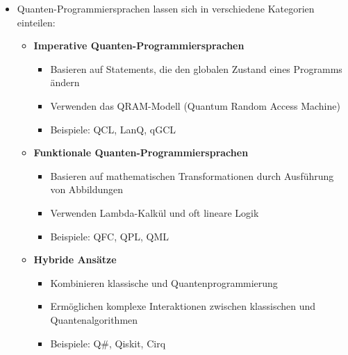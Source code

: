 \begin{itemize}
    \item Quanten-Programmiersprachen lassen sich in verschiedene Kategorien einteilen:
    \begin{itemize}
        \item \textbf{Imperative Quanten-Programmiersprachen}
        \begin{itemize}
            \item Basieren auf Statements, die den globalen Zustand eines Programms ändern
            \item Verwenden das QRAM-Modell (Quantum Random Access Machine)
            \item Beispiele: QCL, LanQ, qGCL
        \end{itemize}
        
        \item \textbf{Funktionale Quanten-Programmiersprachen}
        \begin{itemize}
            \item Basieren auf mathematischen Transformationen durch Ausführung von Abbildungen
            \item Verwenden Lambda-Kalkül und oft lineare Logik
            \item Beispiele: QFC, QPL, QML
        \end{itemize}
        
        \item \textbf{Hybride Ansätze}
        \begin{itemize}
            \item Kombinieren klassische und Quantenprogrammierung
            \item Ermöglichen komplexe Interaktionen zwischen klassischen und Quantenalgorithmen
            \item Beispiele: Q\#, Qiskit, Cirq
        \end{itemize}
    \end{itemize}
\end{itemize}

